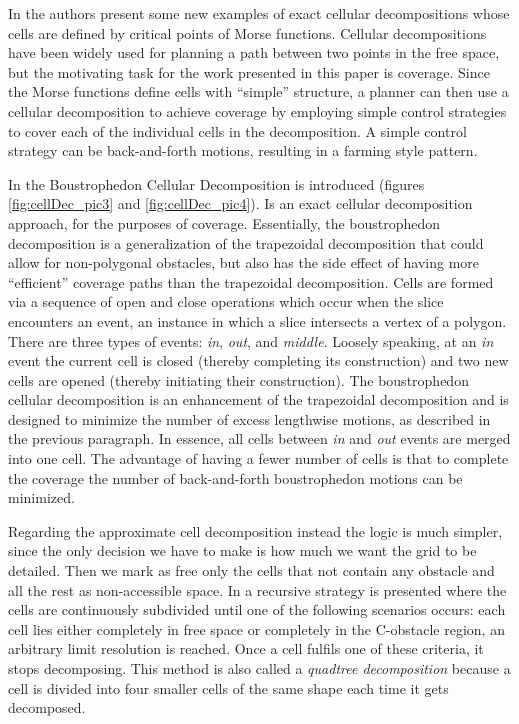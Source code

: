 In \cite{846365} the authors present some new examples of exact cellular decompositions whose cells are defined by critical points of Morse functions. Cellular decompositions have been widely used for planning a path between two points in the free space, but the motivating task for the work presented in this paper is coverage. Since the Morse functions define cells with “simple” structure, a planner can then use a cellular decomposition to achieve coverage by employing simple control strategies to cover each of the individual cells in the decomposition. A simple
control strategy can be back-and-forth motions, resulting in a farming style pattern.



In \cite{choset} the Boustrophedon Cellular Decomposition is introduced (figures \ref{fig:cellDec_pic3} and \ref{fig:cellDec_pic4}). Is an exact cellular decomposition approach, for the purposes of coverage. Essentially, the boustrophedon decomposition is a generalization of the trapezoidal decomposition that could allow for non-polygonal obstacles, but also has the side effect of having more “efficient” coverage paths than the trapezoidal decomposition. Cells are formed via a sequence of open and close operations which occur when the slice encounters an event, an instance in which a slice intersects a vertex of a polygon. There are three types of events: \emph{in}, \emph{out}, and \emph{middle}. Loosely speaking, at an \emph{in} event the current cell is closed (thereby completing its construction) and two new cells are opened (thereby initiating their construction). The boustrophedon cellular decomposition is an enhancement of the trapezoidal decomposition and is designed to minimize the number of excess lengthwise motions, as described in the previous paragraph. In essence, all cells between \emph{in} and \emph{out} events are merged into one cell. The advantage of having a fewer number of cells is that to complete the coverage the number of back-and-forth boustrophedon motions can be minimized. 



Regarding the approximate cell decomposition instead the logic is much simpler, since the only decision we have to make is how much we want the grid to be detailed. Then we mark as free only the cells that not contain any obstacle and all the rest as non-accessible space. In \cite{stanf:cellDec} a recursive strategy is presented where the cells are continuously subdivided until one of the following scenarios occurs: each cell lies either completely in free space or completely in the C-obstacle region, an arbitrary limit resolution is reached.
Once a cell fulfils one of these criteria, it stops decomposing. This method is also called a \emph{quadtree decomposition} because a cell is divided into four smaller cells of the same shape each time it gets decomposed.

